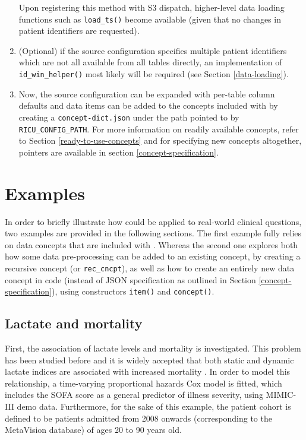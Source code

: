 \documentclass[
  notitle]{jss}
\begin{document}
\begin{enumerate}
  Upon registering this method with S3 dispatch, higher-level data
  loading functions such as \texttt{load\_ts()} become available (given
  that no changes in patient identifiers are requested).
\item
  (Optional) if the source configuration specifies multiple patient
  identifiers which are not all available from all tables directly, an
  implementation of \texttt{id\_win\_helper()} most likely will be
  required (see Section \ref{data-loading}).
\item
  Now, the source configuration can be expanded with per-table column
  defaults and data items can be added to the concepts included with
   by creating a \texttt{concept-dict.json} under the path
  pointed to by \texttt{RICU\_CONFIG\_PATH}. For more information on
  readily available concepts, refer to Section
  \ref{ready-to-use-concepts} and for specifying new concepts
  altogether, pointers are available in section
  \ref{concept-specification}.
\end{enumerate}

\hypertarget{examples}{%
\section{Examples}\label{examples}}

In order to briefly illustrate how  could be applied to
real-world clinical questions, two examples are provided in the
following sections. The first example fully relies on data concepts that
are included with . Whereas the second one explores both how
some data pre-processing can be added to an existing concept, by
creating a recursive concept (or \texttt{rec\_cncpt}), as well as how to
create an entirely new data concept in code (instead of JSON
specification as outlined in Section \ref{concept-specification}), using
constructors \texttt{item()} and \texttt{concept()}.

\hypertarget{lactate-and-mortality}{%
\subsection{Lactate and mortality}\label{lactate-and-mortality}}

First, the association of lactate levels and mortality is investigated.
This problem has been studied before and it is widely accepted that both
static and dynamic lactate indices are associated with increased
mortality \citep{haas2016, nichol2011, van2013}. In order to model this
relationship, a time-varying proportional hazards Cox model
\citep{therneau2000, therneau2015} is fitted, which includes the SOFA
score as a general predictor of illness severity, using MIMIC-III demo
data. Furthermore, for the sake of this example, the patient cohort is
defined to be patients admitted from 2008 onwards (corresponding to the
MetaVision database) of ages 20 to 90 years old.
\end{document}
